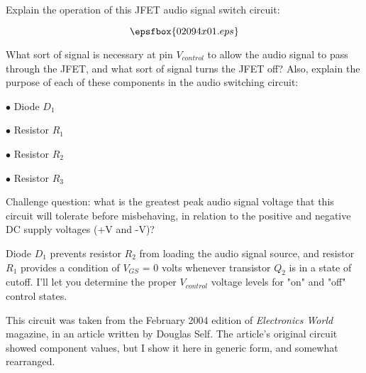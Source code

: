 

Explain the operation of this JFET audio signal switch circuit:

$$\epsfbox{02094x01.eps}$$

What sort of signal is necessary at pin $V_{control}$ to allow the audio signal to pass through the JFET, and what sort of signal turns the JFET off?  Also, explain the purpose of each of these components in the audio switching circuit:

\medskip
\goodbreak
\item{$\bullet$} Diode $D_1$
\item{$\bullet$} Resistor $R_1$
\item{$\bullet$} Resistor $R_2$
\item{$\bullet$} Resistor $R_3$
\medskip

\vskip 10pt

Challenge question: what is the greatest peak audio signal voltage that this circuit will tolerate before misbehaving, in relation to the positive and negative DC supply voltages (+V and -V)?







Diode $D_1$ prevents resistor $R_2$ from loading the audio signal source, and resistor $R_1$ provides a condition of $V_{GS}$ = 0 volts whenever transistor $Q_2$ is in a state of cutoff.  I'll let you determine the proper $V_{control}$ voltage levels for "on" and "off" control states.







This circuit was taken from the February 2004 edition of {\it Electronics World} magazine, in an article written by Douglas Self.  The article's original circuit showed component values, but I show it here in generic form, and somewhat rearranged.




